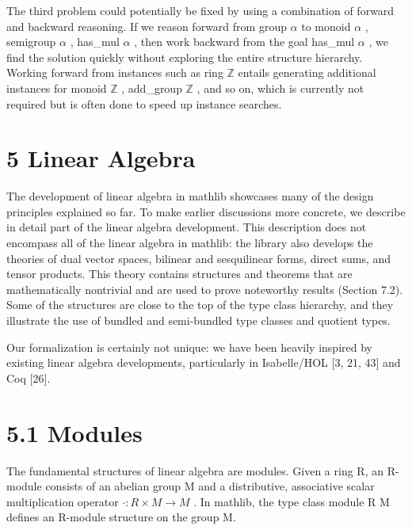 \documentclass[
]{article}
\begin{document}
The third problem could potentially be fixed by using a combination of
forward and backward reasoning. If we reason forward from group
\(\alpha\) to monoid \(\alpha\) , semigroup \(\alpha\) , has\_mul
\(\alpha\) , then work backward from the goal has\_mul \(\alpha\) , we
find the solution quickly without exploring the entire structure
hierarchy. Working forward from instances such as ring \(\mathbb{Z}\)
entails generating additional instances for monoid \(\mathbb{Z}\) ,
add\_group \(\mathbb{Z}\) , and so on, which is currently not required
but is often done to speed up instance searches.

\section{5 Linear Algebra}\label{linear-algebra}

The development of linear algebra in mathlib showcases many of the
design principles explained so far. To make earlier discussions more
concrete, we describe in detail part of the linear algebra development.
This description does not encompass all of the linear algebra in
mathlib: the library also develops the theories of dual vector spaces,
bilinear and sesquilinear forms, direct sums, and tensor products. This
theory contains structures and theorems that are mathematically
nontrivial and are used to prove noteworthy results (Section 7.2). Some
of the structures are close to the top of the type class hierarchy, and
they illustrate the use of bundled and semi-bundled type classes and
quotient types.

Our formalization is certainly not unique: we have been heavily inspired
by existing linear algebra developments, particularly in Isabelle/HOL
{[}3, 21, 43{]} and Coq {[}26{]}.

\section{5.1 Modules}\label{modules}

The fundamental structures of linear algebra are modules. Given a ring
R, an R-module consists of an abelian group M and a distributive,
associative scalar multiplication operator \(\cdot: R \times M \to M\) .
In mathlib, the type class module R M defines an R-module structure on
the group M.
\end{document}
